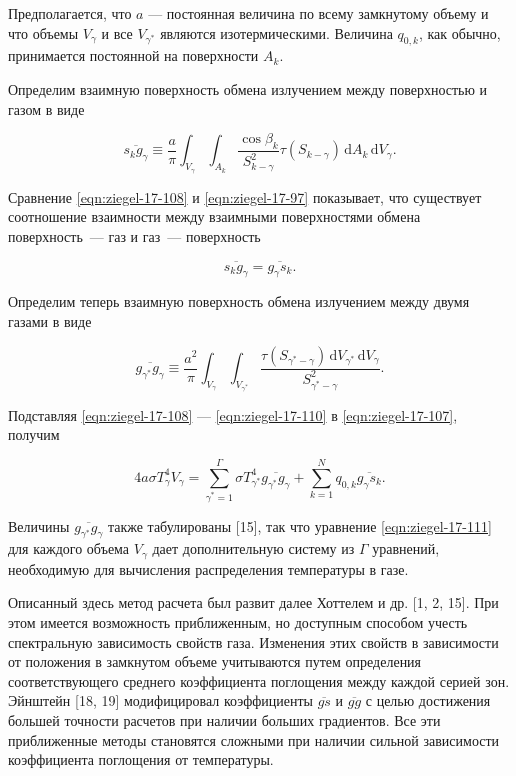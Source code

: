 Предполагается, что $a$ — постоянная величина по всему
замкнутому объему и что объемы $V_\gamma$ и все $V_{\gamma^*}$ являются изотермическими.
Величина $q_{0, k}$, как обычно, принимается постоянной на
поверхности $A_k$.

Определим взаимную поверхность обмена излучением между
поверхностью и газом в виде

\begin{equation}
	\label{eqn:ziegel-17-108}
	\overline{s_k g_\gamma} \equiv \frac a\pi \int_{V_\gamma} \int_{A_k} \frac{\cos{\beta_k}}{S^2_{k-\gamma}} \tau(S_{k-\gamma}) \,\mathrm dA_k \,\mathrm dV_\gamma.
\end{equation}

Сравнение \eqref{eqn:ziegel-17-108} и \eqref{eqn:ziegel-17-97} показывает, что существует
соотношение взаимности между взаимными поверхностями обмена
поверхность~— газ и газ~— поверхность

\begin{equation}
	\overline{s_k g_\gamma} = \overline{g_\gamma s_k}.
\end{equation}

Определим теперь взаимную поверхность обмена излучением
между двумя газами в виде

\begin{equation}
	\label{eqn:ziegel-17-110}
	\overline{g_{\gamma^*} g_\gamma} \equiv \frac{a^2}{\pi} \int_{V_\gamma} \int_{V_{\gamma^*}} \frac{\tau(S_{\gamma^*-\gamma}) \,\mathrm dV_{\gamma^*} \,\mathrm dV_\gamma}{S^2_{\gamma^*-\gamma}}.
\end{equation}

\noindent Подставляя \eqref{eqn:ziegel-17-108} — \eqref{eqn:ziegel-17-110} в \eqref{eqn:ziegel-17-107}, получим

\begin{equation}
	\label{eqn:ziegel-17-111}
	4a\sigma T^4_\gamma V_\gamma = \sum_{\gamma^* = 1}^{\Gamma} \sigma T^4_{\gamma^*} \overline{g_{\gamma^*} g_\gamma} + \sum_{k=1}^{N} q_{0, k} \overline{g_\gamma s_k}.
\end{equation}

\noindent Величины $\overline{g_{\gamma^*} g_\gamma}$ также табулированы [15], так что уравнение
\eqref{eqn:ziegel-17-111} для каждого объема $V_\gamma$ дает дополнительную систему
из $\Gamma$ уравнений, необходимую для вычисления распределения
температуры в газе.


Описанный здесь метод расчета был развит далее Хоттелем
и др. [1, 2, 15]. При этом имеется возможность приближенным,
но доступным способом учесть спектральную зависимость свойств
газа. Изменения этих свойств в зависимости от положения в
замкнутом объеме учитываются путем определения соответствующего
среднего коэффициента поглощения между каждой серией зон.
Эйнштейн [18, 19] модифицировал коэффициенты $\overline{gs}$ и $\overline{gg}$ с целью
достижения большей точности расчетов при наличии больших
градиентов. Все эти приближенные методы становятся сложными
при наличии сильной зависимости коэффициента поглощения
от температуры.

